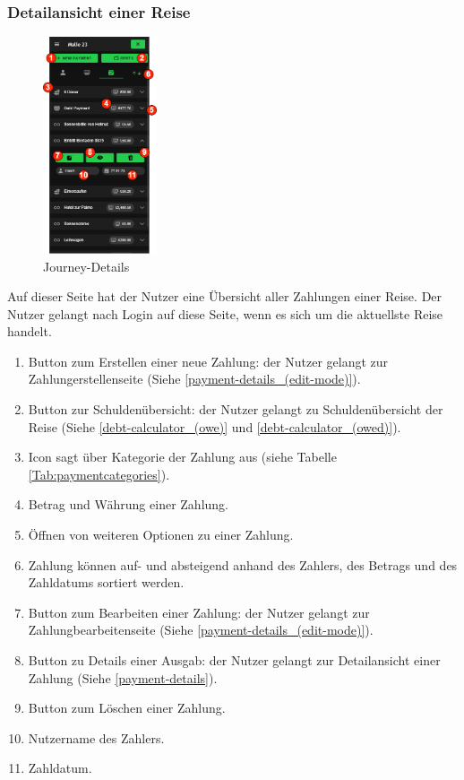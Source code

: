 \subsubsection{Detailansicht einer Reise}\label{Journey-Details}
\begin{figure}[H]
    \centering
    \includegraphics[width=0.3\textwidth]{img/pages_numbers/journey-details.drawio}
    \caption[Journey-Details]{Journey-Details}
    \label{fig:Journey-Details}
\end{figure}
Auf dieser Seite hat der Nutzer eine Übersicht aller Zahlungen einer Reise.
Der Nutzer gelangt nach Login auf diese Seite, wenn es sich um die aktuellste Reise handelt.
\begin{enumerate}[label=\protect\circled{\arabic*}]
	\item Button zum Erstellen einer neue Zahlung: der Nutzer gelangt zur Zahlungerstellenseite (Siehe \ref{payment-details_(edit-mode)}).
	\item Button zur Schuldenübersicht: der Nutzer gelangt zu Schuldenübersicht der Reise (Siehe \ref{debt-calculator_(owe)} und \ref{debt-calculator_(owed)}).
	\item Icon sagt über Kategorie der Zahlung aus (siehe Tabelle \ref{Tab:paymentcategories}).
	\item Betrag und Währung einer Zahlung.
	\item Öffnen von weiteren Optionen zu einer Zahlung.
	\item Zahlung können auf- und absteigend anhand des Zahlers, des Betrags und des Zahldatums sortiert werden.
	\item Button zum Bearbeiten einer Zahlung: der Nutzer gelangt zur Zahlungbearbeitenseite  (Siehe \ref{payment-details_(edit-mode)}).
	\item Button zu Details einer Ausgab: der Nutzer gelangt zur Detailansicht einer Zahlung  (Siehe \ref{payment-details}).
	\item Button zum Löschen einer Zahlung.
	\item Nutzername des Zahlers.
	\item Zahldatum.
\end{enumerate}

